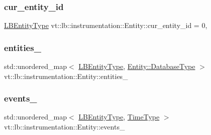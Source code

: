 \subsubsection{\texorpdfstring{cur\+\_\+entity\+\_\+id}{cur\_entity\_id}}
{\footnotesize\ttfamily \hyperlink{namespacevt_a92ec26fb6644cd0ba7eb0ee70c96bee5}{L\+B\+Entity\+Type} vt\+::lb\+::instrumentation\+::\+Entity\+::cur\+\_\+entity\+\_\+id = 0\hspace{0.3cm}{\ttfamily [static]}, {\ttfamily [private]}}

\mbox{\label{structvt_1_1lb_1_1instrumentation_1_1_entity_adb7aa52c4f07c79b2f092ff21c4c184d}} 
\subsubsection{\texorpdfstring{entities\+\_\+}{entities\_}}
{\footnotesize\ttfamily std\+::unordered\+\_\+map$<$ \hyperlink{namespacevt_a92ec26fb6644cd0ba7eb0ee70c96bee5}{L\+B\+Entity\+Type}, \hyperlink{structvt_1_1lb_1_1instrumentation_1_1_entity_a2c8b6bfe6f30a4407a996aaae856b052}{Entity\+::\+Database\+Type} $>$ vt\+::lb\+::instrumentation\+::\+Entity\+::entities\+\_\+\hspace{0.3cm}{\ttfamily [static]}}

\mbox{\label{structvt_1_1lb_1_1instrumentation_1_1_entity_a081fe87532fd7b2a50e90024b11c3fa4}} 
\subsubsection{\texorpdfstring{events\+\_\+}{events\_}}
{\footnotesize\ttfamily std\+::unordered\+\_\+map$<$ \hyperlink{namespacevt_a92ec26fb6644cd0ba7eb0ee70c96bee5}{L\+B\+Entity\+Type}, \hyperlink{namespacevt_a876a9d0cd5a952859c72de8a46881442}{Time\+Type} $>$ vt\+::lb\+::instrumentation\+::\+Entity\+::events\+\_\+\hspace{0.3cm}{\ttfamily [static]}}

